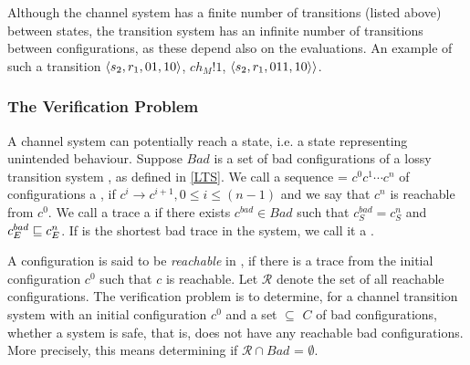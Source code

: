 Although the channel system has a finite number of transitions (listed above) between states, the transition system has an infinite number of transitions between configurations, as these depend also on the evaluations. An example of such a transition $\langle s_2,r_1,01,10\rangle$, $ch_M!1$, $\langle s_2,r_1,011,10\rangle\rangle$.

\subsubsection{The Verification Problem}
A channel system can potentially reach a  state, i.e. a state representing unintended behaviour. Suppose $Bad$ is a set of bad configurations of a lossy transition system , as defined in \ref{LTS}. We call a sequence  = $c^0c^1\cdots c^n$ of configurations a , if $c^i \rightarrow c^{i+1}, 0 \leq i \leq (n-1)$ and we say that $c^n$ is reachable from $c^0$. We call a trace a  if there exists $c^{bad} \in Bad$ such that $c^{bad}_S = c^n_S$ and $c^{bad}_E \sqsubseteq c^{n}_E$. If  is the shortest bad trace in the system, we call it a .

A configuration  is said to be \emph{reachable} in , if there is a trace from the initial configuration $c^0$ such that $c$ is reachable. Let $\mathcal{R}$ denote the set of all reachable configurations. The verification problem is to determine, for a channel transition system  with an initial configuration $c^0$ and a set  $\subseteq$ $C$ of bad configurations, whether a system is safe, that is, does not have any reachable bad configurations. More precisely, this means determining if $\mathcal{R} \cap Bad$ = $\emptyset$.

